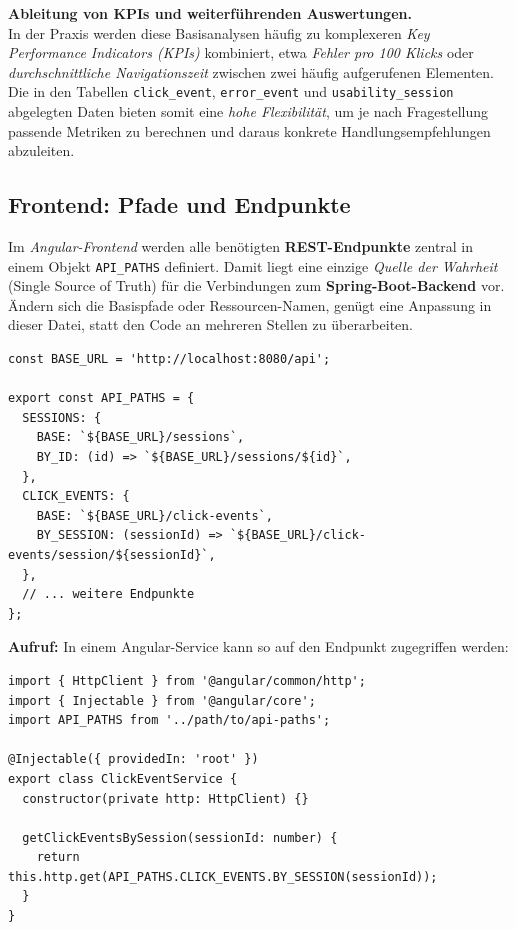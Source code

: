 \documentclass[12pt,oneside]{article}
\begin{document}
\noindent
\textbf{Ableitung von KPIs und weiterführenden Auswertungen.}\\
In der Praxis werden diese Basisanalysen häufig zu komplexeren \emph{Key Performance Indicators (KPIs)} kombiniert, etwa \emph{Fehler pro 100 Klicks} oder \emph{durchschnittliche Navigationszeit} zwischen zwei häufig aufgerufenen Elementen. Die in den Tabellen \lstinline|click_event|, \lstinline|error_event| und \lstinline|usability_session| abgelegten Daten bieten somit eine \emph{hohe Flexibilität}, um je nach Fragestellung passende Metriken zu berechnen und daraus konkrete Handlungsempfehlungen abzuleiten.

 \subsection{Frontend: Pfade und Endpunkte }
\label{subsec:frontend_endpoints}

Im \textit{Angular-Frontend} werden alle benötigten \textbf{REST-Endpunkte} zentral in einem Objekt \lstinline|API_PATHS| definiert. Damit liegt eine einzige \emph{Quelle der Wahrheit} (Single Source of Truth) für die Verbindungen zum \textbf{Spring-Boot-Backend} vor. Ändern sich die Basispfade oder Ressourcen-Namen, genügt eine Anpassung in dieser Datei, statt den Code an mehreren Stellen zu überarbeiten.

\begin{lstlisting}
const BASE_URL = 'http://localhost:8080/api';

export const API_PATHS = {
  SESSIONS: {
    BASE: `${BASE_URL}/sessions`,
    BY_ID: (id) => `${BASE_URL}/sessions/${id}`,
  },
  CLICK_EVENTS: {
    BASE: `${BASE_URL}/click-events`,
    BY_SESSION: (sessionId) => `${BASE_URL}/click-events/session/${sessionId}`,
  },
  // ... weitere Endpunkte
};
\end{lstlisting}

\noindent
\textbf{Aufruf:} In einem Angular-Service kann so auf den Endpunkt zugegriffen werden:
\begin{lstlisting}
import { HttpClient } from '@angular/common/http';
import { Injectable } from '@angular/core';
import API_PATHS from '../path/to/api-paths';

@Injectable({ providedIn: 'root' })
export class ClickEventService {
  constructor(private http: HttpClient) {}

  getClickEventsBySession(sessionId: number) {
    return this.http.get(API_PATHS.CLICK_EVENTS.BY_SESSION(sessionId));
  }
}
\end{lstlisting}
\end{document}
